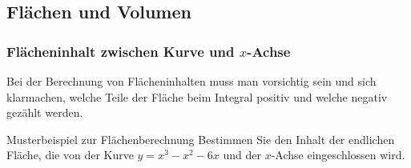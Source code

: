 \subsection{Flächen und Volumen}

\subsubsection{Flächeninhalt zwischen Kurve und \(x\)-Achse}

Bei der Berechnung von Flächeninhalten muss man vorsichtig sein und sich klarmachen, welche Teile der Fläche beim Integral positiv und welche negativ gezählt werden.

\begin{bsp}
	{Musterbeispiel zur Flächenberechnung}{}
	Bestimmen Sie den Inhalt der endlichen Fläche, die von der Kurve \(y=x^3-x^2-6x\) und der \(x\)-Achse eingeschlossen wird.
	\vspace{16cm}

\end{bsp}

